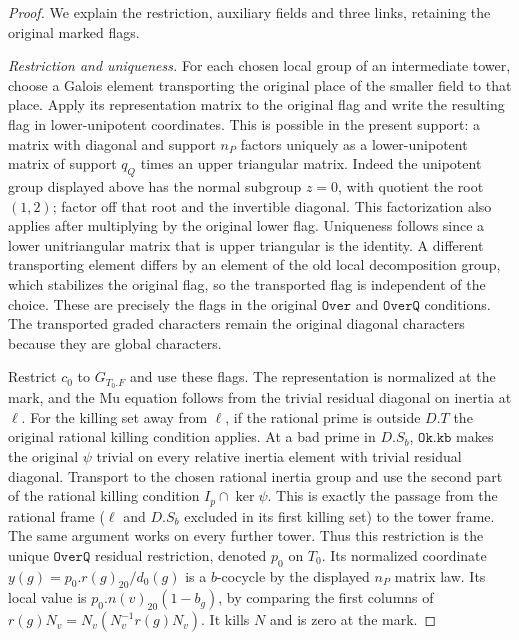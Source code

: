 \begin{proof}
We explain the restriction, auxiliary fields and three
links, retaining the original marked flags.

\emph{Restriction and uniqueness.}
For each chosen local group of an intermediate tower,
choose a Galois element transporting the original place
of the smaller field to that place. Apply its representation
matrix to the original flag and write the resulting flag
in lower-unipotent coordinates. This is possible in the
present support: a matrix with diagonal and support \(n_P\)
factors uniquely as a lower-unipotent matrix of support
\(q_Q\) times an upper triangular matrix. Indeed the
unipotent group displayed above has the normal subgroup
\(z=0\), with quotient the root \((1,2)\); factor off that
root and the invertible diagonal. This factorization also
applies after multiplying by the original lower flag.
Uniqueness follows since a lower unitriangular matrix
that is upper triangular is the identity. A different
transporting element differs by an element of the old
local decomposition group, which stabilizes the original
flag, so the transported flag is independent of the choice.
These are precisely the flags in the original \(\texttt{Over}\)
and \(\texttt{OverQ}\) conditions. The transported graded
characters remain the original diagonal characters because
they are global characters.

Restrict \(c_0\) to \(G_{T_0.F}\) and use these flags.
The representation is normalized at the mark, and the
\(\mathrm{Mu}\) equation follows from the trivial residual
diagonal on inertia at \(\ell\). For the killing set away
from \(\ell\), if the rational prime is outside \(D.T\)
the original rational killing condition applies. At a bad
prime in \(D.S_b\), \(\texttt{Ok.kb}\) makes the original
\(\psi\) trivial on every relative inertia element with
trivial residual diagonal. Transport to the chosen
rational inertia group and use the second part of the
rational killing condition \(I_p\cap\ker\psi\).
This is exactly the passage from the rational frame
(\(\ell\) and \(D.S_b\) excluded in its first killing set)
to the tower frame. The same argument works on every
further tower. Thus this restriction is the unique
\(\texttt{OverQ}\) residual restriction, denoted \(p_0\)
on \(T_0\). Its normalized coordinate
\(y(g)=p_0.r(g)_{20}/d_0(g)\) is a \(b\)-cocycle by
the displayed \(n_P\) matrix law. Its local value is
\(p_0.n(v)_{20}(1-b_g)\), by comparing the first columns
of \(r(g)N_v=N_v(N_v^{-1}r(g)N_v)\). It kills \(N\)
and is zero at the mark.


\end{proof}
